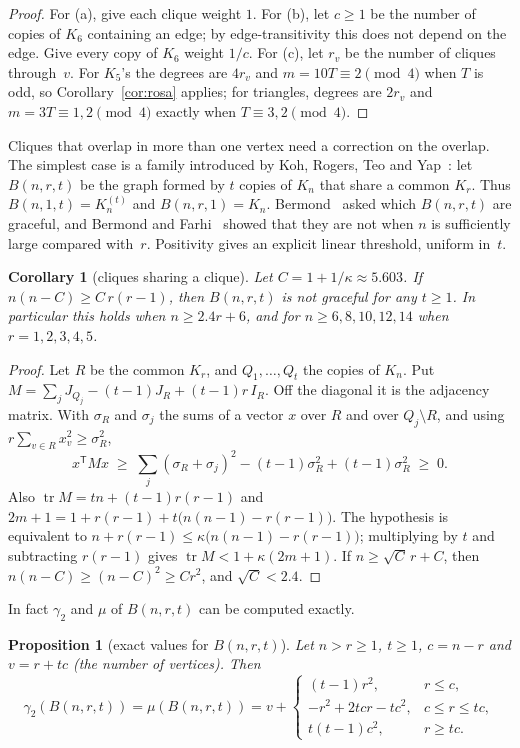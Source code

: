 \documentclass[11pt]{amsart}
\newcommand{\thmmarker}{}
\newcommand{\mnew}{\gdef\thmmarker{\textsuperscript{$\star$}}}
\newcommand{\mgpt}{\gdef\thmmarker{\textsuperscript{$\dagger$}}}
\theoremstyle{tplain}
\newtheorem{corollary}[theorem]{Corollary}
\newtheorem{proposition}[theorem]{Proposition}
\theoremstyle{tdefinition}
\theoremstyle{tremark}
\newcommand{\tr}{\operatorname{tr}}
\begin{document}
\begin{proof}
For (a), give each clique weight $1$. For (b), let $c\ge1$ be the number of
copies of $K_6$ containing an edge; by edge-transitivity this does not depend
on the edge. Give every copy of $K_6$ weight $1/c$. For (c), let $r_v$ be
the number of cliques through~$v$. For $K_5$'s the degrees are $4r_v$ and $m=10T\equiv2\pmod4$ when $T$ is odd, so
Corollary~\ref{cor:rosa} applies; for triangles, degrees are $2r_v$ and
$m=3T\equiv1,2\pmod4$ exactly when $T\equiv3,2\pmod4$.
\end{proof}

Cliques that overlap in more than one vertex need a correction on the
overlap. The simplest case is a family introduced by Koh, Rogers, Teo and
Yap~\cite{koh}: let $B(n,r,t)$ be the graph formed by $t$ copies of $K_n$ that
share a common $K_r$. Thus $B(n,1,t)=K_n^{(t)}$ and $B(n,r,1)=K_n$.
Bermond~\cite{bermond} asked which $B(n,r,t)$ are graceful, and Bermond and
Farhi~\cite{bf} showed that they are not when $n$ is sufficiently large
compared with~$r$. Positivity gives an explicit linear threshold, uniform
in~$t$.

\mnew\begin{corollary}[cliques sharing a clique]\label{cor:bnrt}
Let $C=1+1/\kappa\approx5.603$. If $n(n-C)\ge C\,r(r-1)$, then $B(n,r,t)$ is
not graceful for any $t\ge1$. In particular this holds when $n\ge2.4r+6$, and
for $n\ge6,8,10,12,14$ when $r=1,2,3,4,5$.
\end{corollary}

\begin{proof}
Let $R$ be the common $K_r$, and $Q_1,\dots,Q_t$ the copies of $K_n$. Put
$M=\sum_jJ_{Q_j}-(t-1)J_R+(t-1)r\,I_R$. Off the diagonal it is the adjacency
matrix. With $\sigma_R$ and $\sigma_j$ the sums of a vector $x$ over $R$ and
over $Q_j\setminus R$, and using $r\sum_{v\in R}x_v^2\ge\sigma_R^2$,
\[
  x^{\mathsf T}Mx\;\ge\;\sum_j(\sigma_R+\sigma_j)^2-(t-1)\sigma_R^2+(t-1)\sigma_R^2\;\ge\;0 .
\]
Also $\tr M=tn+(t-1)r(r-1)$ and $2m+1=1+r(r-1)+t\bigl(n(n-1)-r(r-1)\bigr)$.
The hypothesis is equivalent to $n+r(r-1)\le\kappa\bigl(n(n-1)-r(r-1)\bigr)$;
multiplying by $t$ and subtracting $r(r-1)$ gives $\tr M<1+\kappa(2m+1)$. If
$n\ge\sqrt C\,r+C$, then $n(n-C)\ge(n-C)^2\ge Cr^2$, and $\sqrt C<2.4$.
\end{proof}

In fact $\gamma_2$ and $\mu$ of $B(n,r,t)$ can be computed exactly.

\mgpt\begin{proposition}[exact values for $B(n,r,t)$]\label{prop:commoncore}
Let $n>r\ge1$, $t\ge1$, $c=n-r$ and $v=r+tc$ (the number of vertices). Then
\[
 \gamma_2(B(n,r,t))=\mu(B(n,r,t))=
 v+\begin{cases}
   (t-1)r^2,&r\le c,\\
   -r^2+2tcr-tc^2,&c\le r\le tc,\\
   t(t-1)c^2,&r\ge tc.
 \end{cases}
\]
\end{proposition}
\end{document}
